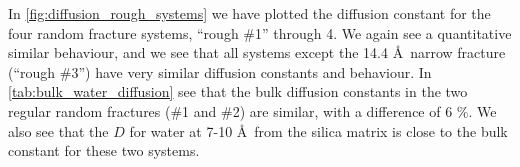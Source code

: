 In \cref{fig:diffusion_rough_systems} we have plotted the diffusion constant %
for the four random fracture systems, ``rough \#1'' through 4. We again see a quantitative similar behaviour, and we see that all systems except the 14.4 \AA\ narrow fracture (``rough \#3'') have very similar diffusion constants and behaviour. In \cref{tab:bulk_water_diffusion} see that the bulk diffusion constants in the two regular random fractures (\#1 and \#2) are similar, with a difference of {6 \%}. We also see that the $D$ for water at 7-10 \AA\ from the silica matrix is close to the bulk constant for these two systems.
%
%
%
